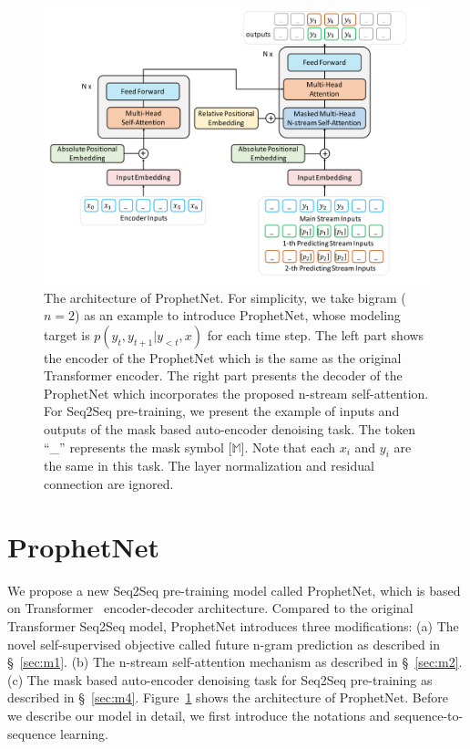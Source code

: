 \documentclass[11pt,a4paper]{article}
\begin{document}
\begin{figure}[th]
    \centering
	\includegraphics[width = 5.0 in]{2-2.pdf}
	\caption{The architecture of ProphetNet. For simplicity, we take bigram ($n=2$) as an example to introduce ProphetNet, whose modeling target is $p(y_{t}, y_{t+1}|y_{<t}, x)$ for each time step. The left part shows the encoder of the ProphetNet which is the same as the original Transformer encoder. The right part presents the decoder of the ProphetNet which incorporates the proposed n-stream self-attention.
	For Seq2Seq pre-training, we present the example of inputs and outputs of the mask based auto-encoder denoising task. The token ``\_'' represents the mask symbol [$\mathbb{M}$]. Note that each $x_i$ and $y_i$ are the same in this task. The layer normalization and residual connection are ignored.}\label{fig:overall}
\end{figure}

\section{ProphetNet}
We propose a new Seq2Seq pre-training model called ProphetNet, which is based on Transformer~\cite{vaswani2017attention} encoder-decoder architecture. Compared to the original Transformer Seq2Seq model, ProphetNet introduces three modifications: 
(a) The novel self-supervised objective called future n-gram prediction as described in \S~\ref{sec:m1}. 
(b) The n-stream self-attention mechanism as described in \S~\ref{sec:m2}.
(c) The mask based auto-encoder denoising task for Seq2Seq pre-training as described in \S~\ref{sec:m4}.
Figure~\ref{fig:overall} shows the architecture of ProphetNet.
Before we describe our model in detail, we first introduce the notations and sequence-to-sequence learning. 
 
\end{document}
